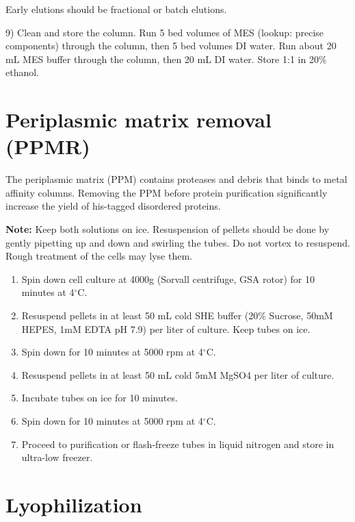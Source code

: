 \begin{enumerate}
Early elutions should be fractional or batch elutions.

9) Clean and store the column. Run 5 bed volumes of MES (lookup: precise components) through the column, then 5 bed volumes DI water. 
Run about 20 mL MES buffer through the column, then 20 mL DI water.  Store 1:1 in 20\% ethanol.

\end{enumerate}

\section{Periplasmic matrix removal (PPMR)}
\label{sec:ppmr}

The periplasmic matrix (PPM) contains proteases and debris that binds to metal affinity columns.  Removing the PPM before protein purification significantly increase the yield of his-tagged disordered proteins.

\textbf{Note:} Keep both solutions on ice.  Resuspension of pellets should be done by gently pipetting up and down and swirling the tubes.  Do not vortex to resuspend.  Rough treatment of the cells may lyse them.

\begin{enumerate}

\item Spin down cell culture at 4000g (Sorvall centrifuge, GSA rotor) for 10 minutes at 4$^\circ$C.

\item Resuspend pellets in at least 50 mL cold SHE buffer (20\% Sucrose, 50mM HEPES, 1mM EDTA pH 7.9) per liter of culture.  Keep tubes on ice.

\item Spin down for 10 minutes at 5000 rpm at 4$^\circ$C.

\item Resuspend pellets in at least 50 mL cold 5mM MgSO4 per liter of culture.

\item Incubate tubes on ice for 10 minutes.

\item Spin down for 10 minutes at 5000 rpm at 4$^\circ$C.

\item Proceed to purification or flash-freeze tubes in liquid nitrogen and store in ultra-low freezer.
\end{enumerate}

\section{Lyophilization}

